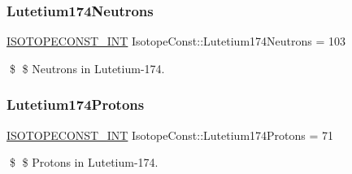 \subsubsection{\texorpdfstring{Lutetium174\+Neutrons}{Lutetium174Neutrons}}
{\footnotesize\ttfamily \mbox{\hyperlink{group___isotope_const-_macros_ga5f18360b3e99483a35c32d789e62621c}{I\+S\+O\+T\+O\+P\+E\+C\+O\+N\+S\+T\+\_\+\+I\+NT}} Isotope\+Const\+::\+Lutetium174\+Neutrons = 103}

\$ \$ Neutrons in Lutetium-\/174. \mbox{\label{group___isotope_const-_lutetium-_lu174_ga50e4da82712b882dacc49bf97b7a56d0}} 
\subsubsection{\texorpdfstring{Lutetium174\+Protons}{Lutetium174Protons}}
{\footnotesize\ttfamily \mbox{\hyperlink{group___isotope_const-_macros_ga5f18360b3e99483a35c32d789e62621c}{I\+S\+O\+T\+O\+P\+E\+C\+O\+N\+S\+T\+\_\+\+I\+NT}} Isotope\+Const\+::\+Lutetium174\+Protons = 71}

\$ \$ Protons in Lutetium-\/174. 